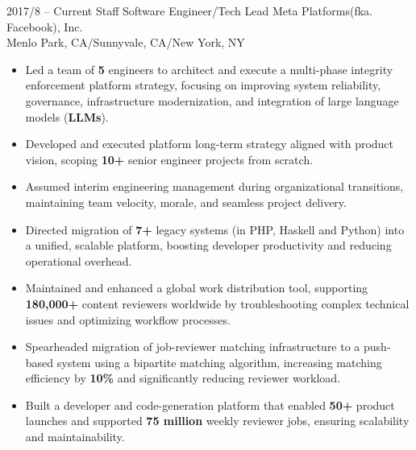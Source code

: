 \documentclass[9pt]{developercv} %
\begin{document}
\vspace{0.5cm}






\begin{entrylist}
	\entry
		{2017/8 -- Current}
		{Staff Software Engineer/Tech Lead}
		{Meta Platforms(fka. Facebook), Inc.\\\footnotesize{Menlo Park, CA/Sunnyvale, CA/New York, NY}} 
		{
			\begin{itemize}[leftmargin=-0.0125in]
				\item Led a team of \textbf{5} engineers to architect and execute a multi-phase integrity enforcement platform strategy, focusing on improving system reliability, governance, infrastructure modernization, and integration of large language models (\textbf{LLMs}).
				\item Developed and executed platform long-term strategy aligned with product vision, scoping \textbf{10+} senior engineer projects from scratch.
				\item Assumed interim engineering management during organizational transitions, maintaining team velocity, morale, and seamless project delivery.
				\item Directed migration of \textbf{7+} legacy systems (in PHP, Haskell and Python) into a unified, scalable platform, boosting developer productivity and reducing operational overhead.
				\item Maintained and enhanced a global work distribution tool, supporting \textbf{180,000+} content reviewers worldwide by troubleshooting complex technical issues and optimizing workflow processes.
				\item Spearheaded migration of job-reviewer matching infrastructure to a push-based system using a bipartite matching algorithm, increasing matching efficiency by \textbf{10\%} and significantly reducing reviewer workload.
				\item Built a developer and code-generation platform that enabled \textbf{50+} product launches and supported \textbf{75 million} weekly reviewer jobs, ensuring scalability and maintainability.

\end{itemize}}
\end{entrylist}
\end{document}
